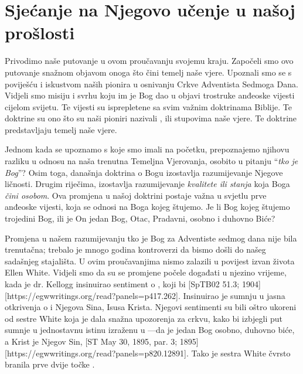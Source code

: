 \chapter{Sjećanje na Njegovo učenje u našoj prošlosti}

Privodimo naše putovanje u ovom proučavanju svojemu kraju. Započeli smo ovo putovanje snažnom objavom onoga što čini temelj naše vjere. Upoznali smo se s poviješću i iskustvom naših pionira u osnivanju Crkve Adventista Sedmoga Dana. Vidjeli smo misiju i svrhu koju im je Bog dao u objavi trostruke anđeoske vijesti cijelom svijetu. Te vijesti su isprepletene sa svim važnim doktrinama Biblije. Te doktrine su ono što su naši pioniri nazivali , ili stupovima naše vjere. Te doktrine predstavljaju temelj naše vjere.

Jednom kada se upoznamo s  koje smo imali na početku, prepoznajemo njihovu razliku u odnosu na naša trenutna Temeljna Vjerovanja, osobito u pitanju “\textit{tko je Bog}”? Osim toga, današnja doktrina o Bogu izostavlja razumijevanje Njegove ličnosti. Drugim riječima, izostavlja razumijevanje \textit{kvalitete ili stanja} koja Boga \textit{čini osobom}. Ova promjena u našoj doktrini postaje važna u svjetlu prve anđeoske vijesti, koja se odnosi na Boga kojeg štujemo. Je li Bog kojeg štujemo trojedini Bog, ili je On jedan Bog, Otac, Pradavni, osobno i duhovno Biće?

Promjena u našem razumijevanju tko je Bog za Adventiste sedmog dana nije bila trenutačna; trebalo je mnogo godina kontroverzi da bismo došli do našeg sadašnjeg stajališta. U ovim proučavanjima nismo zalazili u povijest izvan života Ellen White. Vidjeli smo da su se promjene počele događati u njezino vrijeme, kada je dr. Kellogg insinuirao sentiment o , koji bi [SpTB02 51.3; 1904][https://egwwritings.org/read?panels=p417.262]. Insinuirao je sumnju u jasna otkrivenja o  i Njegova Sina, Isusa Krista. Njegovi sentimenti su bili oštro ukoreni od sestre White koja je dala snažna upozorenja za crkvu, kako bi izbjegli put sumnje u jednostavnu istinu izraženu u —da je jedan Bog osobno, duhovno biće, a Krist je Njegov Sin, [ST May 30, 1895, par. 3; 1895][https://egwwritings.org/read?panels=p820.12891]. Tako je sestra White čvrsto branila prve dvije točke .

